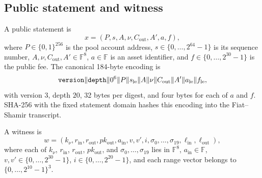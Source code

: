 \subsection{Public statement and witness}

\begin{definition}
\label{def:profile23-statement}
A public statement is
\[
 x=(P,s,A,\nu,C_{\mathrm{out}},A',a,f),
\]
where \(P\in\{0,1\}^{256}\) is the pool account address,
\(s\in\{0,\ldots,2^{64}-1\}\) is its sequence number,
\(A,\nu,C_{\mathrm{out}},A'\in\mathbb F^8\),
\(a\in\mathbb F\) is an asset identifier, and
\(f\in\{0,\ldots,2^{30}-1\}\) is the public fee.
The canonical 184-byte encoding is
\[
 \mathtt{version}\|\mathtt{depth}\|0^6\|P\|s_{\rm le}\|A\|\nu\|
 C_{\mathrm{out}}\|A'\|a_{\rm le}\|f_{\rm le},
\]
with version \(3\), depth \(20\), 32 bytes per digest, and four bytes for
each of \(a\) and \(f\).  SHA-256 with the fixed statement domain hashes
this encoding into the Fiat--Shamir transcript.
\end{definition}

\begin{definition}
\label{def:profile23-witness}
A witness is
\[
 w=(k_\nu,r_{\mathrm{in}},r_{\mathrm{out}},pk_{\mathrm{out}},
    a_{\mathrm{in}},v,v',i,
    \sigma_0,\ldots,\sigma_{19},
    \boldsymbol\ell_{\mathrm{in}},
    \boldsymbol\ell_{\mathrm{out}}),
\]
where each of \(k_\nu\), \(r_{\mathrm{in}}\),
\(r_{\mathrm{out}}\), \(pk_{\mathrm{out}}\), and
\(\sigma_0,\ldots,\sigma_{19}\) lies in \(\mathbb F^8\),
\(a_{\mathrm{in}}\in\mathbb F\),
\(v,v'\in\{0,\ldots,2^{30}-1\}\),
\(i\in\{0,\ldots,2^{20}-1\}\), and each range vector belongs to
\(\{0,\ldots,2^{10}-1\}^3\).
\end{definition}

